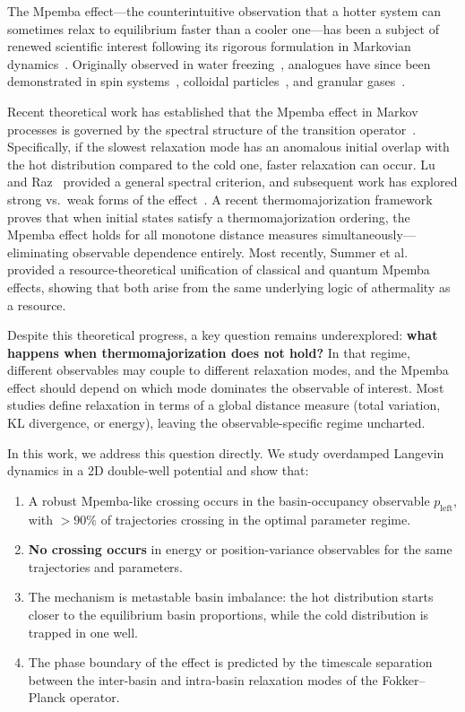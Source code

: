 \documentclass[aps,pre,reprint,superscriptaddress,showpacs]{revtex4-2}
\begin{document}
The Mpemba effect---the counterintuitive observation that a hotter system can
sometimes relax to equilibrium faster than a cooler one---has been a subject of
renewed scientific interest following its rigorous formulation in Markovian
dynamics~\cite{LuRaz2017,Klich2019,Kumar2020}. Originally observed in water
freezing~\cite{Mpemba1969}, analogues have since been demonstrated in spin
systems~\cite{BaityJesi2019}, colloidal particles~\cite{Gal2020}, and
granular gases~\cite{Lasanta2017}.

Recent theoretical work has established that the Mpemba effect in Markov
processes is governed by the spectral structure of the transition
operator~\cite{LuRaz2017,Klich2019}. Specifically, if the slowest relaxation
mode has an anomalous initial overlap with the hot distribution compared to the
cold one, faster relaxation can occur. Lu and Raz~\cite{LuRaz2017} provided a
general spectral criterion, and subsequent work has explored strong vs.\ weak
forms of the effect~\cite{Kumar2020,Lapolla2020}. A recent thermomajorization
framework~\cite{VuHayakawa2025} proves that when initial states satisfy a
thermomajorization ordering, the Mpemba effect holds for all monotone distance
measures simultaneously---eliminating observable dependence entirely. Most
recently, Summer et al.~\cite{Summer2026} provided a resource-theoretical
unification of classical and quantum Mpemba effects, showing that both arise
from the same underlying logic of athermality as a resource.

Despite this theoretical progress, a key question remains underexplored:
\textbf{what happens when thermomajorization does not hold?} In that regime,
different observables may couple to different relaxation modes, and the Mpemba
effect should depend on which mode dominates the observable of interest. Most
studies define relaxation in terms of a global distance measure (total
variation, KL divergence, or energy), leaving the observable-specific regime
uncharted.

In this work, we address this question directly. We study overdamped Langevin
dynamics in a 2D double-well potential and show that:
\begin{enumerate}
\item A robust Mpemba-like crossing occurs in the basin-occupancy observable
  $p_\mathrm{left}$, with $>90\%$ of trajectories crossing in the optimal
  parameter regime.
\item \textbf{No crossing occurs} in energy or position-variance observables
  for the same trajectories and parameters.
\item The mechanism is metastable basin imbalance: the hot distribution starts
  closer to the equilibrium basin proportions, while the cold distribution is
  trapped in one well.
\item The phase boundary of the effect is predicted by the timescale separation
  between the inter-basin and intra-basin relaxation modes of the Fokker--Planck
  operator.
\end{enumerate}
\end{document}
